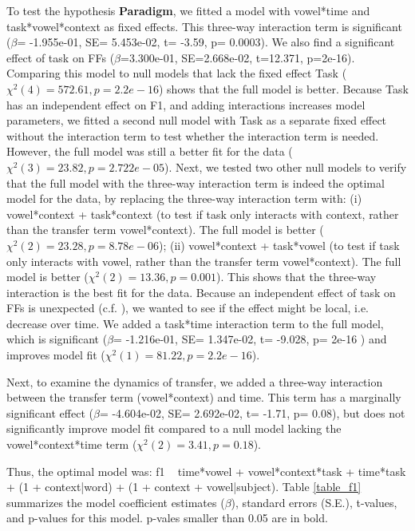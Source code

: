 \documentclass[12 pt]{article}
\begin{document}
To test the hypothesis \textbf{Paradigm}, we fitted a model with vowel*time and task*vowel*context as fixed effects. This three-way interaction term is significant ($\beta$= -1.955e-01, SE=  5.453e-02, t= -3.59, p= 0.0003). We also find a significant effect of task on FFs ($\beta$=3.300e-01, SE=2.668e-02, t=12.371, p=2e-16). Comparing this model to null models that lack the fixed effect Task ($\chi^2(4) = 572.61, p=  2.2e-16$) shows that the full model is better. Because Task has an independent effect on F1, and adding interactions increases model parameters, we fitted a second null model with Task as a separate fixed effect without the interaction term to test whether the interaction term is needed. However, the full model was still a better fit for the data ($\chi^2(3) = 23.82, p=  2.722e-05$). Next, we tested two other null models to verify that the full model with the three-way interaction term is indeed the optimal model for the data, by replacing the three-way interaction term with: (i) vowel*context + task*context (to test if task only interacts with context, rather than the transfer term vowel*context). The full model is better ($\chi^2(2) = 23.28, p= 8.78e-06$); (ii) vowel*context + task*vowel (to test if task only interacts with vowel, rather than the transfer term vowel*context). The full model is better ($\chi^2(2) = 13.36, p= 0.001$). This shows that the three-way interaction is the best fit for the data. Because an independent effect of task on FFs is unexpected (c.f. ), we wanted to see if the effect might be local, i.e. decrease over time. We added a task*time interaction term to the full model, which is significant ($\beta$= -1.216e-01, SE=  1.347e-02, t= -9.028, p= 2e-16 ) and improves model fit ($\chi^2(1) = 81.22, p= 2.2e-16$).

Next, to examine the dynamics of transfer, we added a three-way interaction between the transfer term (vowel*context) and time. This term has a marginally significant effect ($\beta$= -4.604e-02, SE=  2.692e-02, t= -1.71, p= 0.08), but does not significantly improve model fit compared to a null model lacking the vowel*context*time term ($\chi^2(2) = 3.41, p= 0.18$).

Thus, the optimal model was: f1 ~ time*vowel + vowel*context*task + time*task + (1 + context|word) + (1 + context + vowel|subject). Table \ref{table_f1} summarizes the model coefficient estimates ($\beta$), standard errors (S.E.), t-values, and p-values for this model. \alert{p-vales smaller than 0.05 are in bold.} 
\end{document}
